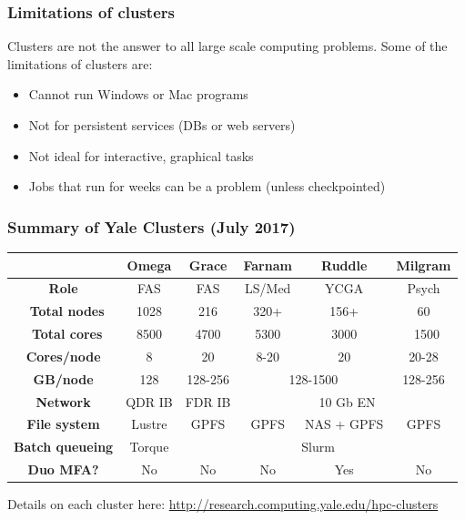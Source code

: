 \documentclass[10pt]{beamer}
\begin{document}
\begin{frame}
\frametitle{Limitations of clusters}
Clusters are not the answer to all large scale computing problems.
Some of the limitations of clusters are:

\begin{itemize}
\item Cannot run Windows or Mac programs
\item Not for persistent services (DBs or web servers)
\item Not ideal for interactive, graphical tasks
\item Jobs that run for weeks can be a problem (unless checkpointed)
\end{itemize}
\end{frame}

\begin{frame}[fragile]
\frametitle{Summary of Yale Clusters (July 2017)}
\begin{tabular}{|c|c|c|c|c|c|}
\hline
& \textbf{Omega} & \textbf{Grace}& \textbf{Farnam} & \textbf{Ruddle} & \textbf{Milgram} \\
\hline
\textbf{Role} & FAS & FAS & LS/Med & YCGA & Psych \\
\hline
\textbf{~Total nodes} & 1028 & 216 & 320+ & 156+ & 60 \\
\hline
\textbf{~Total cores} & 8500 & 4700 & 5300 & 3000 & ~1500 \\
\hline
\textbf{Cores/node} & 8 & 20 & 8-20 & 20 & 20-28 \\
\hline
\textbf{GB/node} & 128 & 128-256 & \multicolumn{2}{|c|}{128-1500} & 128-256 \\
\hline
\textbf{Network} & QDR IB & FDR IB & \multicolumn{3}{|c|}{10 Gb EN}   \\
\hline
\textbf{File system} & Lustre & GPFS & GPFS & NAS + GPFS & GPFS \\
\hline
\textbf{Batch queueing} & Torque & \multicolumn{4}{|c|}{Slurm}  \\
\hline
\textbf{Duo MFA?} & No & No & No & Yes & No \\
\hline
\end{tabular}

\vskip10pt

Details on each cluster here:
\url{http://research.computing.yale.edu/hpc-clusters}

\end{frame}
\end{document}
